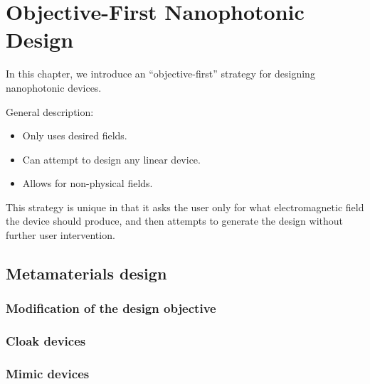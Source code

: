 \newcommand{\BE}{\begin{equation}}
\newcommand{\EE}{\end{equation}}
\newcommand{\BA}{\begin{eqnarray}}
\newcommand{\EA}{\end{eqnarray}}
\newcommand{\curl}{\nabla\times}
\newcommand{\minimize}[1]{\JLUminimize_{#1}\;&}
\newcommand{\subto}{\text{subject to}\;&}
\newcommand{\myfig}[2]{\begin{figure}[!h]\texttt{[image: fig/\#1]}\caption{#2}\label{#1}\end{figure}}
\newcommand{\BI}{\begin{itemize}\item}
\renewcommand{\I}{\item}
\newcommand{\EI}{\end{itemize}}
\newcommand{\ER}[1]{\eqref{eq:#1}}
\chapter{Objective-First Nanophotonic Design}
\label{intro}


In this chapter, we introduce an ``objective-first'' strategy 
    for designing nanophotonic devices.

General description:
\BI Only uses desired fields.
\I  Can attempt to design any linear device.
\I  Allows for non-physical fields. \EI

This strategy is unique in that it
    asks the user only for what electromagnetic field
    the device should produce,
    and then attempts to generate the design
    without further user intervention.



% 
% 
% 

\section{Metamaterials design}
\subsection{Modification of the design objective}
\subsection{Cloak devices}
\subsection{Mimic devices}

